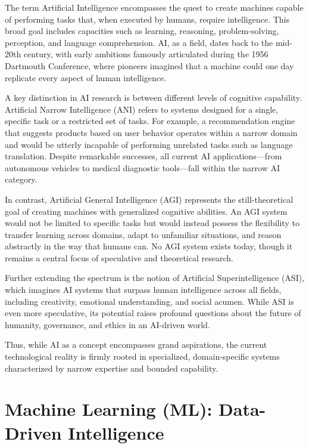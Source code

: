 \documentclass[openany]{book}
\begin{document}
The term Artificial Intelligence encompasses the quest to create machines 
capable of performing tasks that, when executed by humans, require intelligence.
This broad goal includes capacities such as learning, reasoning, 
problem-solving, perception, and language comprehension. AI, as a field, dates 
back to the mid-20th century, with early ambitions famously articulated during 
the 1956 Dartmouth Conference, where pioneers imagined that a machine could one 
day replicate every aspect of human intelligence.

A key distinction in AI research is between different levels of cognitive 
capability. Artificial Narrow Intelligence (ANI) refers to systems designed for 
a single, specific task or a restricted set of tasks. For example, a 
recommendation engine that suggests products based on user behavior operates 
within a narrow domain and would be utterly incapable of performing unrelated 
tasks such as language translation. Despite remarkable successes, all current AI
applications—from autonomous vehicles to medical diagnostic tools—fall within 
the narrow AI category.

In contrast, Artificial General Intelligence (AGI) represents the 
still-theoretical goal of creating machines with generalized cognitive 
abilities. An AGI system would not be limited to specific tasks but would 
instead possess the flexibility to transfer learning across domains, adapt to 
unfamiliar situations, and reason abstractly in the way that humans can. No AGI 
system exists today, though it remains a central focus of speculative and 
theoretical research.

Further extending the spectrum is the notion of Artificial Superintelligence 
(ASI), which imagines AI systems that surpass human intelligence across all 
fields, including creativity, emotional understanding, and social acumen. While 
ASI is even more speculative, its potential raises profound questions about the 
future of humanity, governance, and ethics in an AI-driven world.

Thus, while AI as a concept encompasses grand aspirations, the current 
technological reality is firmly rooted in specialized, domain-specific systems 
characterized by narrow expertise and bounded capability.

\section{Machine Learning (ML): Data-Driven Intelligence}
\end{document}
